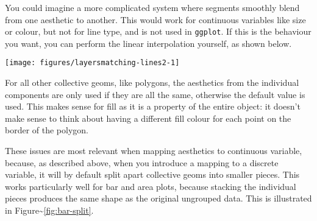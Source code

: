 You could imagine a more complicated system where segments smoothly
blend from one aesthetic to another. This would work for continuous
variables like size or colour, but not for line type, and is not used in
\texttt{ggplot}. If this is the behaviour you want, you can perform the
linear interpolation yourself, as shown below.

\begin{Shaded}
\begin{Highlighting}[]
\NormalTok{>}\StringTok{ }\StringTok{ }\NormalTok{(} \NormalTok{))}
\NormalTok{>}\StringTok{ }\StringTok{ }\NormalTok{(}
\NormalTok{+}\StringTok{   } 
\NormalTok{+}\StringTok{   }  
\NormalTok{+}\StringTok{   }  
\NormalTok{+}\StringTok{ }\NormalTok{)}
\NormalTok{>}\StringTok{ }   \NormalTok{(}\NormalTok{)) +}\StringTok{ }
\NormalTok{+}\StringTok{   }\NormalTok{(}  \NormalTok{)}
\end{Highlighting}
\end{Shaded}

\texttt{[image: figures/layersmatching-lines2-1]}

For all other collective geoms, like polygons, the aesthetics from the
individual components are only used if they are all the same, otherwise
the default value is used. This makes sense for fill as it is a property
of the entire object: it doesn't make sense to think about having a
different fill colour for each point on the border of the polygon.

These issues are most relevant when mapping aesthetics to continuous
variable, because, as described above, when you introduce a mapping to a
discrete variable, it will by default split apart collective geoms into
smaller pieces. This works particularly well for bar and area plots,
because stacking the individual pieces produces the same shape as the
original ungrouped data. This is illustrated in
Figure\textasciitilde{}\ref{fig:bar-split}.

